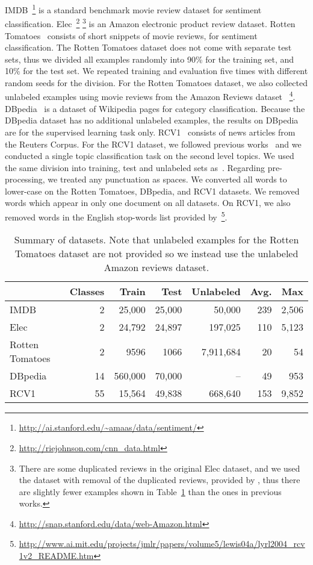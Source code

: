 \documentclass{article}
\begin{document}
IMDB~\cite[]{maas2011learning}\footnote{\url{http://ai.stanford.edu/~amaas/data/sentiment/}}
is a standard benchmark movie review dataset for sentiment classification.
Elec~\cite[]{johnson2015semi}\footnote{\url{http://riejohnson.com/cnn_data.html}}
\footnote{There are some duplicated reviews in the
original Elec dataset, and we used the dataset with removal of the duplicated
reviews, provided by \cite{johnson2015semi}, thus there are slightly fewer examples shown
in Table~\ref{tab:dataset}
than the ones in previous works\cite[]{johnson2015semi, johnson2016supervised}.}
is an Amazon electronic product review dataset.
Rotten Tomatoes~\cite[]{pang2005seeing} consists of short snippets of movie reviews,
for sentiment classification.
The Rotten Tomatoes dataset does not come with separate test sets, thus we divided all
examples randomly into 90\% for the training set, and 10\% for the test set. We repeated
training and evaluation five times with different random seeds for the division. 
For the Rotten Tomatoes dataset, we also collected
unlabeled examples using movie reviews from the Amazon Reviews dataset~\cite[]{mcauley2013hidden}
\footnote{\url{http://snap.stanford.edu/data/web-Amazon.html}}.
DBpedia~\cite[]{lehmann2015dbpedia, zhang2015character} is a dataset of Wikipedia pages for category
classification.
Because the
DBpedia dataset has no additional unlabeled examples, the results on DBpedia are for the
supervised learning task only.
RCV1~\cite[]{lewis2004rcv1} consists of news articles from the Reuters Corpus.
For the RCV1 dataset, we followed previous works~\cite[]{johnson2015semi} and we
conducted a single topic classification task on the second level topics.
We used the same division into training, test and unlabeled sets as~\citet{johnson2015semi}. 
Regarding pre-processing, we treated any punctuation as spaces.
We converted all words to lower-case on the Rotten Tomatoes, DBpedia, and RCV1
datasets.
We removed words which appear in only one document on all datasets.  
On RCV1, we also removed words in the English stop-words list provided by~\citet{lewis2004rcv1}\footnote{\url{http://www.ai.mit.edu/projects/jmlr/papers/volume5/lewis04a/lyrl2004_rcv1v2_README.htm}}.  
\begin{table}[ht]
  \centering
		\caption{\label{tab:dataset} Summary of datasets. Note that unlabeled
examples for the Rotten Tomatoes dataset are not provided so we instead use the unlabeled Amazon reviews 
dataset. }
\begin{tabular}{lrrrrrr}
			\toprule
			 & Classes & Train & Test & Unlabeled & Avg.  & Max  \\
			\midrule
			IMDB & 2 & 25,000 & 25,000 & 50,000 & 239 & 2,506 \\
			Elec & 2 & 24,792 & 24,897 & 197,025 & 110 & 5,123 \\
			Rotten Tomatoes & 2 & 9596 & 1066 & 7,911,684 & 20 & 54  \\
			DBpedia & 14 & 560,000 & 70,000 & -- & 49 & 953 \\
			RCV1  & 55 & 15,564 & 49,838 & 668,640 &153 & 9,852 \\
			\bottomrule
		\end{tabular}
\end{table}
\end{document}
